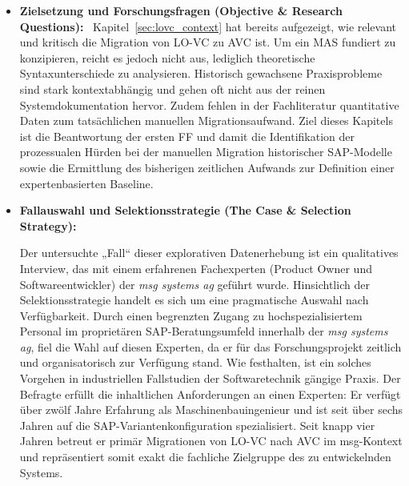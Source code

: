 \begin{itemize}

\item \textbf{Zielsetzung und Forschungsfragen (Objective \& Research Questions):} \
Kapitel~\ref{sec:lovc_context} hat bereits aufgezeigt, wie relevant und kritisch die Migration von \ac{LO-VC} zu \ac{AVC} ist. Um ein \ac{MAS} fundiert zu konzipieren, reicht es jedoch nicht aus, lediglich theoretische Syntaxunterschiede zu analysieren. Historisch gewachsene Praxisprobleme sind stark kontextabhängig und gehen oft nicht aus der reinen Systemdokumentation hervor. Zudem fehlen in der Fachliteratur quantitative Daten zum tatsächlichen manuellen Migrationsaufwand. Ziel dieses Kapitels ist die Beantwortung der ersten \ac{FF} und damit die Identifikation der prozessualen Hürden bei der manuellen Migration historischer SAP-Modelle sowie die Ermittlung des bisherigen zeitlichen Aufwands zur Definition einer expertenbasierten Baseline.

\item \textbf{Fallauswahl und Selektionsstrategie (The Case \& Selection Strategy):} \

Der untersuchte „Fall“ dieser explorativen Datenerhebung ist ein qualitatives Interview, das mit einem erfahrenen Fachexperten (Product Owner und Softwareentwickler) der \textit{msg systems ag} geführt wurde. Hinsichtlich der Selektionsstrategie handelt es sich um eine pragmatische Auswahl nach Verfügbarkeit. Durch einen begrenzten Zugang zu hochspezialisiertem Personal im proprietären SAP-Beratungsumfeld innerhalb der \textit{msg systems ag}, fiel die Wahl auf diesen Experten, da er für das Forschungsprojekt zeitlich und organisatorisch zur Verfügung stand. Wie \textcite{runesonGuidelinesConductingReporting2009} festhalten, ist ein solches Vorgehen in industriellen Fallstudien der Softwaretechnik gängige Praxis. Der Befragte erfüllt die inhaltlichen Anforderungen an einen Experten: Er verfügt über zwölf Jahre Erfahrung als Maschinenbauingenieur und ist seit über sechs Jahren auf die SAP-Variantenkonfiguration spezialisiert. Seit knapp vier Jahren betreut er primär Migrationen von \ac{LO-VC} nach \ac{AVC} im msg-Kontext und repräsentiert somit exakt die fachliche Zielgruppe des zu entwickelnden Systems.


\end{itemize}
